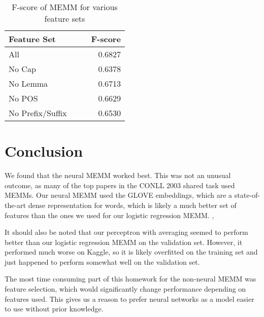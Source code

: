 \documentclass[11pt]{article}
\begin{document}
\begin{table}[h]
  \centering
  \begin{tabular}{lccr}
    \toprule
    Feature Set & & & F-score \\
    \midrule
    All & & & 0.6827 \\
    No Cap & & & 0.6378 \\
    No Lemma & & & 0.6713 \\
    No POS & & & 0.6629 \\
    No Prefix/Suffix & & & 0.6530
  \end{tabular}
  \caption{F-score of MEMM for various feature sets}
  \label{tab:perceptron}
\end{table}

\section{Conclusion}

We found that the neural MEMM worked best. This was not an unusual outcome, as many of the top papers in the CONLL 2003 shared task used MEMMs. Our neural MEMM used the GLOVE embeddings, which are a state-of-the-art dense representation for words, which is likely a much better set of features than the ones we used for our logistic regression MEMM. ,

It should also be noted that our perceptron with averaging seemed to perform better than our logistic regression MEMM on the validation set. However, it performed much worse on Kaggle, so it is likely overfitted on the training set and just happened to perform somewhat well on the validation set. 

The most time consuming part of this homework for the non-neural MEMM was feature selection, which would significantly change performance depending on features used. This gives us a reason to prefer neural networks as a model easier to use without prior knowledge.



\end{document}
